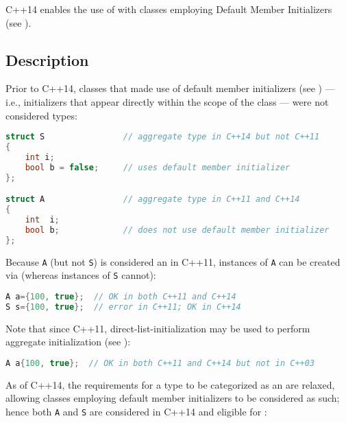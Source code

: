 


C++14 enables the use of  with classes
employing Default Member Initializers (see ).

\subsection[Description]{Description}\label{description}

Prior to C++14, classes that made use of default member initializers (see ) --- i.e., initializers that appear directly within the
scope of the class --- were not considered  types:

\begin{lstlisting}[language=C++]
struct S                // aggregate type in C++14 but not C++11
{
    int i;
    bool b = false;     // uses default member initializer
};

struct A                // aggregate type in C++11 and C++14
{
    int  i;
    bool b;             // does not use default member initializer
};
\end{lstlisting}

\noindent Because \lstinline!A! (but not \lstinline!S!) is considered an  in
C++11, instances of \lstinline!A! can be created via  (whereas instances of \lstinline!S! cannot):

\begin{lstlisting}[language=C++]
A a={100, true};  // OK in both C++11 and C++14
S s={100, true};  // error in C++11; OK in C++14
\end{lstlisting}


\noindent Note that since C++11, direct-list-initialization may be used to perform aggregate initialization (see ):
\begin{lstlisting}[language=C++]
A a{100, true};  // OK in both C++11 and C++14 but not in C++03
\end{lstlisting}
As of C++14, the requirements for a type to be categorized as an
 are relaxed, allowing classes employing default
member initializers to be considered as such; hence both \lstinline!A! and
\lstinline!S! are considered  in C++14 and eligible for
:

